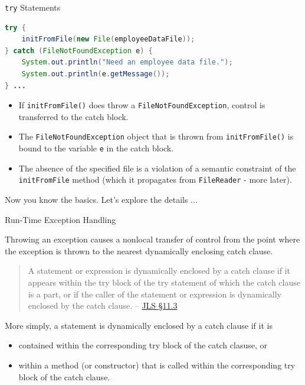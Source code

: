 \documentclass{beamer}
\begin{document}
\begin{frame}[fragile]{{\tt try} Statements}


\begin{lstlisting}[language=Java]
try {
    initFromFile(new File(employeeDataFile));
} catch (FileNotFoundException e) {
    System.out.println("Need an employee data file.");
    System.out.println(e.getMessage());
} ...
\end{lstlisting}

\begin{itemize}
\item If {\tt initFromFile()} does throw a {\tt FileNotFoundException}, control is transferred to the catch block.
\item The {\tt FileNotFoundException} object that is thrown from {\tt initFromFile()} is bound to the variable {\tt e} in the catch block.
\item The absence of the specified file is a violation of a semantic constraint of the {\tt initFromFile} method (which it propagates from {\tt FileReader} - more later).
\end{itemize}
Now you know the basics.  Let's explore the details ...

\end{frame}


\begin{frame}[fragile]{Run-Time Exception Handling}


Throwing an exception causes a nonlocal transfer of control from the point where the exception is thrown to the nearest dynamically enclosing catch clause.
\begin{quote}
A statement or expression is dynamically enclosed by a catch clause if it appears within the try block of the try statement of which the catch clause is a part, or if the caller of the statement or expression is dynamically enclosed by the catch clause. -- \href{http://docs.oracle.com/javase/specs/jls/se7/html/jls-11.html#jls-11.3}{JLS \S 11.3}
\end{quote}
More simply, a statement is dynamically enclosed by a catch clause if it is
\begin{itemize}
\item contained within the corresponding try block of the catch clasuse, or
\item  within a method (or constructor) that is called within the corresponding try block of the catch clause.
\end{itemize}

\end{frame}
\end{document}
